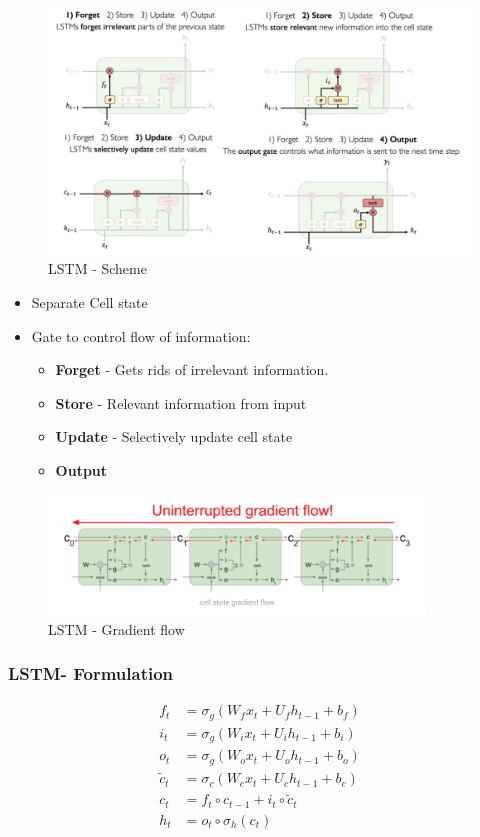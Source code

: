 \documentclass[12pt]{report}
\begin{document}
\begin{figure}[H]\centering\includegraphics[width=14cm]{LSTM_SCHEME.jpeg}\caption{LSTM - Scheme}\end{figure}

\begin{itemize}
	\item Separate Cell state
	\item Gate to control flow of information:
	\begin{itemize}
		\item \textbf{Forget} - Gets rids of irrelevant information.
		\item \textbf{Store} - Relevant information from input
		\item \textbf{Update} - Selectively update cell state
		\item \textbf{Output}
	\end{itemize}
\end{itemize}


\begin{figure}[H]\centering\includegraphics[width=10cm]{LSTM_GRADIENT_FLOW.png}\caption{LSTM - Gradient flow}\end{figure}


\subsubsection{LSTM- Formulation}
\begin{align*}
	f_t &= \sigma_g(W_{f} x_t + U_{f} h_{t-1} + b_f) \\
	i_t &= \sigma_g(W_{i} x_t + U_{i} h_{t-1} + b_i) \\
	o_t &= \sigma_g(W_{o} x_t + U_{o} h_{t-1} + b_o) \\
	\tilde{c}_t &= \sigma_c(W_{c} x_t + U_{c} h_{t-1} + b_c) \\
	c_t &= f_t \circ c_{t-1} + i_t \circ \tilde{c}_t \\
	h_t &= o_t \circ \sigma_h(c_t)
\end{align*}
\end{document}

